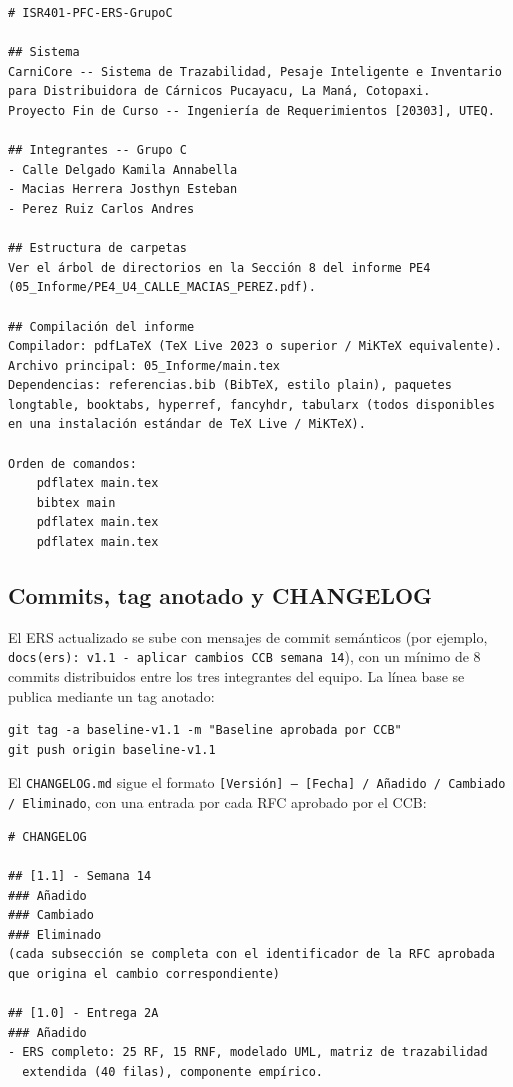 \documentclass[11pt,a4paper]{article}
\begin{document}
\begin{verbatim}
# ISR401-PFC-ERS-GrupoC

## Sistema
CarniCore -- Sistema de Trazabilidad, Pesaje Inteligente e Inventario
para Distribuidora de Cárnicos Pucayacu, La Maná, Cotopaxi.
Proyecto Fin de Curso -- Ingeniería de Requerimientos [20303], UTEQ.

## Integrantes -- Grupo C
- Calle Delgado Kamila Annabella
- Macias Herrera Josthyn Esteban
- Perez Ruiz Carlos Andres

## Estructura de carpetas
Ver el árbol de directorios en la Sección 8 del informe PE4
(05_Informe/PE4_U4_CALLE_MACIAS_PEREZ.pdf).

## Compilación del informe
Compilador: pdfLaTeX (TeX Live 2023 o superior / MiKTeX equivalente).
Archivo principal: 05_Informe/main.tex
Dependencias: referencias.bib (BibTeX, estilo plain), paquetes
longtable, booktabs, hyperref, fancyhdr, tabularx (todos disponibles
en una instalación estándar de TeX Live / MiKTeX).

Orden de comandos:
    pdflatex main.tex
    bibtex main
    pdflatex main.tex
    pdflatex main.tex
\end{verbatim}

\subsection{Commits, tag anotado y CHANGELOG}
El ERS actualizado se sube con mensajes de commit semánticos (por ejemplo, \texttt{docs(ers): v1.1 - aplicar cambios CCB semana 14}), con un mínimo de 8 commits distribuidos entre los tres integrantes del equipo. La línea base se publica mediante un tag anotado:

\begin{verbatim}
git tag -a baseline-v1.1 -m "Baseline aprobada por CCB"
git push origin baseline-v1.1
\end{verbatim}

El \texttt{CHANGELOG.md} sigue el formato \texttt{[Versión] -- [Fecha] / Añadido / Cambiado / Eliminado}, con una entrada por cada RFC aprobado por el CCB:

\begin{verbatim}
# CHANGELOG

## [1.1] - Semana 14
### Añadido
### Cambiado
### Eliminado
(cada subsección se completa con el identificador de la RFC aprobada
que origina el cambio correspondiente)

## [1.0] - Entrega 2A
### Añadido
- ERS completo: 25 RF, 15 RNF, modelado UML, matriz de trazabilidad
  extendida (40 filas), componente empírico.
\end{verbatim}
\end{document}
